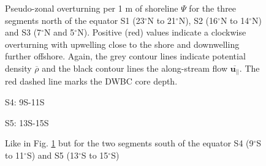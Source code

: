 \documentclass{ametsoc}
\begin{document}
\begin{figure}[h!]
\begin{minipage}[]{0.32\textwidth}
	\end{minipage}
	\caption{Pseudo-zonal overturning per 1 m of shoreline $\Psi$ for the three segments north of the equator S1 (23$^\circ$N to 21$^\circ$N), S2 (16$^\circ$N to 14$^\circ$N) and S3 (7$^\circ$N and 5$^\circ$N). Positive (red) values indicate a clockwise overturning with upwelling close to the shore and downwelling further offshore. Again, the grey contour lines indicate potential density $\overline{\rho}$ and the black contour lines the along-stream flow $\overline{\mathbf{u_{||}}}$. The red dashed line marks the DWBC core depth.  }
	\label{fig:results:streamfunction_north}
\end{figure}

\begin{figure}[h!]
	\centering
	\begin{minipage}[]{0.32\textwidth}
	\centering S4: 9S-11S \\
	\end{minipage}
	\begin{minipage}[]{0.32\textwidth}
\centering S5: 13S-15S \\		
	\end{minipage}
	\caption{Like in Fig. \ref{fig:results:streamfunction_north} but for the two segments south of the equator S4 (9$^\circ$S to 11$^\circ$S) and S5 (13$^\circ$S to 15$^\circ$S)}
		\label{fig:results:streamfunction_south}
\end{figure}
\end{document}
